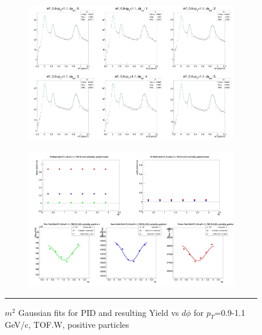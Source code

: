 \begin{figure}[H]
  \centering
    \begin{subfigure}[p]{1\textwidth}
    \includegraphics[width=1\textwidth]{lowptfits/yieldvsdphi_tof1_cent0_ch1_pT-9-11.jpg}
    \end{subfigure}
    \begin{subfigure}[p]{1\textwidth}
    \includegraphics[width=1\textwidth]{lowptfits/fitParams_tof1_cent0_ch1_pT-9-11.jpg}
    \end{subfigure}
    \rule{35em}{0.5pt}
  \caption[PID fits and Yield vs $d\phi$ for $p_T$=0.9-1.1 GeV/c, TOF.W, positive particles ]{$m^2$ Gaussian fits for PID and resulting Yield vs $d\phi$ for $p_T$=0.9-1.1 GeV/c, TOF.W, positive particles}
  \label{fig:fits9-11pos}
\end{figure}

